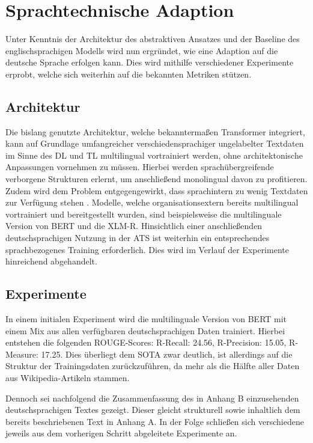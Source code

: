 \chapter{Sprachtechnische Adaption}
\thispagestyle{fancy}
\label{chap:Sprachtechnische Adaption}

\noindent
Unter Kenntnis der Architektur des abstraktiven Ansatzes und der Baseline des englischsprachigen Modells wird nun ergründet, wie eine Adaption auf die deutsche Sprache erfolgen kann. Dies wird mithilfe verschiedener Experimente erprobt, welche sich weiterhin auf die bekannten Metriken stützen.


\section{Architektur}
\noindent
Die bislang genutzte Architektur, welche bekanntermaßen Transformer integriert, kann auf Grundlage umfangreicher verschiedensprachiger ungelabelter Textdaten im Sinne des \ac{DL} und \ac{TL} multilingual vortrainiert werden, ohne architektonische Anpassungen vornehmen zu müssen. Hierbei werden sprachübergreifende verborgene Strukturen erlernt, um anschließend monolingual davon zu profitieren. Zudem wird dem Problem entgegengewirkt, dass sprachintern zu wenig Textdaten zur Verfügung stehen \cite{MOB20}. Modelle, welche organisationsextern bereits multilingual vortrainiert und bereitgestellt wurden, sind beispielsweise die multilinguale Version von \ac{BERT} und die \ac{XLM-R}. Hinsichtlich einer anschließenden deutschsprachigen Nutzung in der \ac{ATS} ist weiterhin ein entsprechendes sprachbezogenes Training erforderlich. Dies wird im Verlauf der Experimente hinreichend abgehandelt.


\section{Experimente}
\noindent
In einem initialen Experiment wird die multilinguale Version von \ac{BERT} mit einem Mix aus allen verfügbaren deutschsprachigen Daten trainiert. Hierbei entstehen die folgenden \ac{ROUGE}-Scores: R-Recall: 24.56, R-Precision: 15.05, R-Measure: 17.25. Dies überliegt dem \ac{SOTA} zwar deutlich, ist allerdings auf die Struktur der Trainingsdaten zurückzuführen, da mehr als die Hälfte aller Daten aus Wikipedia-Artikeln stammen.
\newpage

\noindent
Dennoch sei nachfolgend die Zusammenfassung des in Anhang B einzusehenden deutschsprachigen Textes gezeigt. Dieser gleicht strukturell sowie inhaltlich dem bereits beschriebenen Text in Anhang A. In der Folge schließen sich verschiedene jeweils aus dem vorherigen Schritt abgeleitete Experimente an.\\

